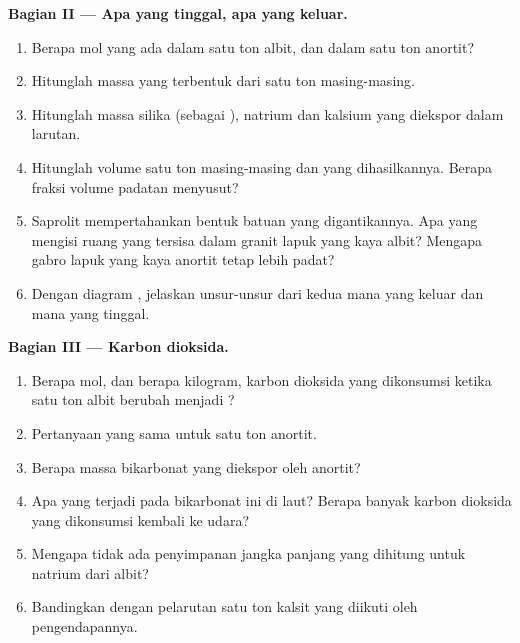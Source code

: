 \begin{problem}
\medskip
\noindent\textbf{Bagian II --- Apa yang tinggal, apa yang keluar.}
\begin{enumerate}[resume]
  \item Berapa mol yang ada dalam satu ton albit, dan dalam satu ton anortit?
  \item Hitunglah massa  yang terbentuk dari satu ton masing-masing.
  \item Hitunglah massa silika (sebagai ), natrium dan kalsium yang diekspor dalam larutan.
  \item Hitunglah volume satu ton masing-masing  dan  yang dihasilkannya. Berapa fraksi volume padatan menyusut?
  \item Saprolit mempertahankan bentuk batuan yang digantikannya. Apa yang mengisi ruang yang tersisa dalam granit lapuk yang kaya albit? Mengapa gabro lapuk yang kaya anortit tetap lebih padat?
  \item Dengan diagram , jelaskan unsur-unsur dari kedua  mana yang keluar dan mana yang tinggal.
\end{enumerate}

\medskip
\noindent\textbf{Bagian III --- Karbon dioksida.}
\begin{enumerate}[resume]
  \item Berapa mol, dan berapa kilogram, karbon dioksida yang dikonsumsi ketika satu ton albit berubah menjadi ?
  \item Pertanyaan yang sama untuk satu ton anortit.
  \item Berapa massa bikarbonat yang diekspor oleh anortit?
  \item Apa yang terjadi pada bikarbonat ini di laut? Berapa banyak karbon dioksida yang dikonsumsi kembali ke udara?
  \item Mengapa tidak ada penyimpanan jangka panjang yang dihitung untuk natrium dari albit?
  \item Bandingkan dengan pelarutan satu ton kalsit yang diikuti oleh pengendapannya.
\end{enumerate}


\end{problem}
